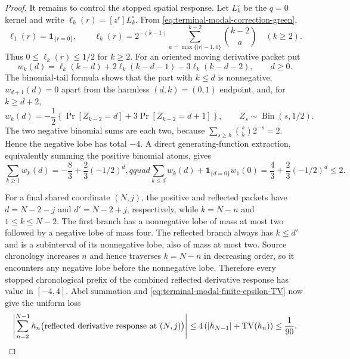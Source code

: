 \begin{proof}
It remains to control the stopped spatial response.  Let $L_k^\circ$ be the
$q=0$ kernel and write
$\ell_k(r)=[z^r]L_k^\circ$.  From
\eqref{eq:terminal-modal-correction-green},
\begin{equation}
 \ell_{1}(r)=\mathbf1_{\{r=0\}},\qquad
 \ell_k(r)=2^{-(k-1)}
 \sum_{a=\max\{|r|-1,0\}}^{k-2}\binom{k-2}{a}
 \quad(k\ge2).
 \label{eq:terminal-modal-finite-l-coefficients}
\end{equation}
Thus $0\le\ell_k(r)\le1/2$ for $k\ge2$.  For an oriented moving derivative
packet put
\begin{equation}
 w_k(d)=\ell_k(k-d)+2\ell_k(k-d-1)-3\ell_k(k-d-2),\qquad d\ge0.
\end{equation}
The binomial-tail formula shows that the part with $k\le d$ is nonnegative,
$w_{d+1}(d)=0$ apart from the harmless $(d,k)=(0,1)$ endpoint, and, for
$k\ge d+2$,
\begin{equation}
 w_k(d)=-\frac12\left\{\Pr[Z_{k-2}=d]
 +3\Pr[Z_{k-2}=d+1]\right\},\qquad
 Z_s\sim\operatorname{Bin}(s,1/2).
 \label{eq:terminal-modal-finite-derivative-negative-lobe}
\end{equation}
The two negative binomial sums are each two, because
$\sum_{s\ge h}\binom{s}{h}2^{-s}=2$.  Hence the negative lobe has total
$-4$.  A direct generating-function extraction, equivalently summing the
positive binomial atoms, gives
\begin{equation}
 \sum_{k\ge1}w_k(d)=-\frac83+\frac23(-1/2)^d,qquad
 \sum_{k\le d}w_k(d)+\mathbf1_{\{d=0\}}w_1(0)
 =\frac43+\frac23(-1/2)^d\le2.
 \label{eq:terminal-modal-finite-derivative-lobes}
\end{equation}

For a final shared coordinate $(N,j)$, the positive and reflected packets
have $d=N-2-j$ and $d'=N-2+j$, respectively, while $k=N-n$ and
$1\le k\le N-2$.  The first branch has a nonnegative lobe of mass at most
two followed by a negative lobe of mass four.  The reflected branch always
has $k\le d'$ and is a subinterval of its nonnegative lobe, also of mass at most
two.  Source chronology increases $n$ and hence traverses $k=N-n$ in
decreasing order, so it encounters any negative lobe before the nonnegative
lobe.  Therefore every stopped chronological prefix of the combined
reflected derivative response has value in $[-4,4]$.  Abel summation and
\eqref{eq:terminal-modal-finite-epsilon-TV} now give the uniform loss
\begin{equation}
 \left|\sum_{n=2}^{N-1}h_n
 \bigl(\hbox{reflected derivative response at $(N,j)$}\bigr)\right|
 \le4\left(|h_{N-1}|+\operatorname{TV}(h_n)\right)
 \le\frac1{90}.
 \label{eq:terminal-modal-finite-derivative-loss}
\end{equation}


\end{proof}
